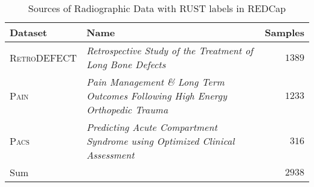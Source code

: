 \begin{table}[H]
    \centering
    \begin{tabularx}{\textwidth}{@{}lXr@{}}
    \toprule
    \textbf{Dataset}     & \textbf{Name} & \textbf{Samples} \\ \midrule
    \autocite{RetroDEFECT2022} \textsc{RetroDEFECT} & \emph{Retrospective Study of the Treatment of Long Bone Defects}    & $1389$             \\
    \autocite{PAIN2017} \textsc{Pain}        & \emph{Pain Management \& Long Term Outcomes Following High Energy Orthopedic Trauma}      & $1233$             \\
    \autocite{PACS2022} \textsc{Pacs}        & \emph{Predicting Acute Compartment Syndrome using Optimized Clinical Assessment}    & $316$             \\ \midrule
    Sum         &      & $2938$            \\ \bottomrule
    \end{tabularx}%
    \caption{Sources of Radiographic Data with RUST labels in REDCap}\label{tab:datasets}
\end{table}
